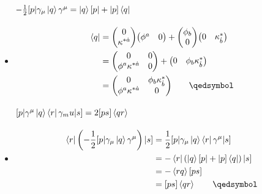 \documentclass{beamer}
\begin{document}
\begin{frame}
\begin{itemize}
        \framesubtitle<2>{$-\frac{1}{2}[p|\gamma_\mu\ket{q}\gamma^\mu = \ket{q}[p| + |p]\bra{q}$} 
        \item<only@2>
        \begin{align*}
            [p|\gamma_\mu\ket{q} &= \mqty(\phi^a & 0)\mqty(0 & \sigma_{\mu a\dot{c}} \\ \bar{\sigma}_{\mu}^{\dot{a}c} & 0)\mqty(0 \\ \kappa^{*\dot{a}})\mqty(0 & \sigma_{b\dot{d}}^\mu \\ \bar{\sigma}^{\mu\dot{b}d} & 0) \\
            &= \mqty(0 & \phi^a\kappa^{*\dot{a}}\sigma_{\mu a\dot{a}}\sigma_{b\dot{d}}^\mu \\ \phi^a\kappa^{*\dot{a}}\sigma_{\mu a\dot{a}}\sigma^{\mu b\dot{d}} & 0) \\
            &= \mqty(0 & -2\phi_b\kappa_{\dot{b}}^* \\ -2\phi^a\kappa^{*\dot{a}} & 0) \\
            \ket{q}[p| + |p]\bra{q} &= \mqty(0 \\ \kappa^{*\dot{a}})\mqty(\phi^a & 0) + \mqty(\phi_b \\ 0)\mqty(0 & \kappa_{\dot{b}}^*) \\
            &= \mqty(0 & 0 \\ \phi^a\kappa^{*\dot{a}} & 0) + \mqty(0 & \phi_b\kappa_{\dot{b}}^*) \\
            &= \mqty(0 & \phi_b\kappa_{\dot{b}}^* \\ \phi^a\kappa^{*\dot{a}} & 0) \qquad\qedsymbol
        \end{align*}

        \framesubtitle<3>{$[p|\gamma^\mu\ket{q}\bra{r}\gamma_mu|s] = 2[ps]\ev{qr}$}
        \item<only@3>
        \begin{align*}
            \bra{r}\left(-\frac{1}{2}[p|\gamma_\mu\ket{q}\gamma^\mu\right)|s] &= \frac{1}{2}[p|\gamma_\mu\ket{q}\bra{r}\gamma^\mu|s] \\
            &= -\bra{r}\left(\ket{q}[p| + |p]\bra{q}\right)|s] \\
            &= -\ev{rq}[ps] \\
            &= [ps]\ev{qr} \qquad\qedsymbol
        \end{align*}
    \end{itemize}
\end{frame}
\end{document}
